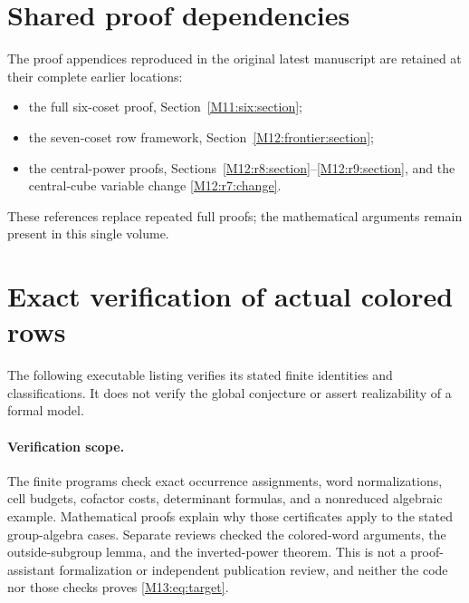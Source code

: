 \documentclass[11pt,a4paper,oneside]{report}
\theoremstyle{definition}
\theoremstyle{remark}
\begin{document}
\clearpage


\section{Shared proof dependencies}
The proof appendices reproduced in the original latest manuscript
are retained at their complete earlier locations:
\begin{itemize}
\item the full six-coset proof, Section~\ref{M11:six:section};
\item the seven-coset row framework, Section~\ref{M12:frontier:section};
\item the central-power proofs,
Sections~\ref{M12:r8:section}--\ref{M12:r9:section}, and the
central-cube variable change \eqref{M12:r7:change}.
\end{itemize}
These references replace repeated full proofs; the mathematical
arguments remain present in this single volume.


\section{Exact verification of actual colored rows}
The following executable listing verifies its stated finite
identities and classifications. It does not verify the global
conjecture or assert realizability of a formal model.

\paragraph{Verification scope.}
The finite programs check exact occurrence assignments, word
normalizations, cell budgets, cofactor costs, determinant formulas,
and a nonreduced algebraic example. Mathematical proofs explain
why those certificates apply to the stated group-algebra cases.
Separate reviews checked the colored-word arguments, the
outside-subgroup lemma, and the inverted-power theorem. This is
not a proof-assistant formalization or independent publication
review, and neither the code nor those checks proves
\eqref{M13:eq:target}.
\end{document}
